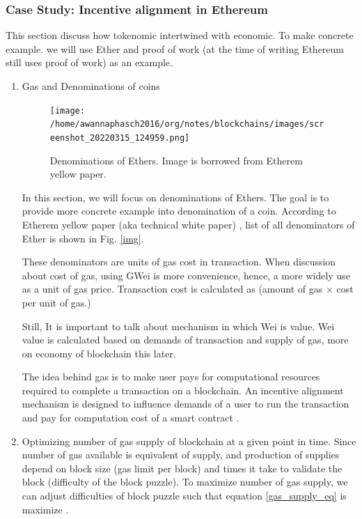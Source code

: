 \documentclass{IEEEtran}
\begin{document}
\subsubsection{Case Study: Incentive alignment in Ethereum}
\label{sec:org9ff249f}
This section discuss how tokenomic intertwined with economic. To make concrete example. we will use Ether and proof of work (at the time of writing Ethereum still uses proof of work) as an example.
\begin{enumerate}
\item Gas and Denominations of coins
\label{sec:orgfe24fe0}
\begin{figure}[htbp]
\centering
\texttt{[image: /home/awannaphasch2016/org/notes/blockchains/images/screenshot\_20220315\_124959.png]}
\caption{\label{fig:img}Denominations of Ethers. Image is borrowed from Etherem yellow paper.}
\end{figure}

In this section, we will focus on denominations of Ethers. The goal is to provide more concrete example into denomination of a coin. According to Etherem yellow paper (aka technical white paper)  \cite{wood2014ethereum}, list of all denominators of Ether is shown in Fig. \ref{img}.

These denominators are units of gas cost in transaction. When discussion about cost of gas, using GWei is more convenience, hence, a more widely use as a unit of gas price. Transaction cost is calculated as (amount of gas \(\times\) cost per unit of gas.)

Still, It is important to talk about mechanism in which Wei is value.
Wei value is calculated based on demands of transaction and supply of gas, more on economy of blockchain this later.

The idea behind gas is to make user pays for computational resources required to complete a transaction on a blockchain. An incentive alignment mechanism is designed to influence demands of a user to run the transaction and pay for computation cost of a smart contract \cite{el2021decentralized}.
\item Optimizing number of gas supply of blockchain at a given point in time.
\label{sec:org0f8787a}
Since number of gas available is equivalent of supply, and production of supplies depend on block size (gas limit per block) and times it take to validate the block (difficulty of the block puzzle). To maximize number of gas supply, we can adjust difficulties of block puzzle such that equation \ref{gas_supply_eq} is maximize \cite{wood2014ethereum}.



\end{enumerate}
\end{document}
